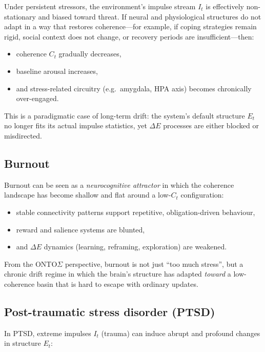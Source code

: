\documentclass[12pt,a4paper]{report}
\begin{document}
Under persistent stressors, the environment's impulse stream \(I_t\) is effectively non-stationary and biased toward threat. If neural and physiological structures do not adapt in a way that restores coherence---for example, if coping strategies remain rigid, social context does not change, or recovery periods are insufficient---then:

\begin{itemize}[leftmargin=2em]
    \item coherence \(C_t\) gradually decreases,
    \item baseline arousal increases,
    \item and stress-related circuitry (e.g.\ amygdala, HPA axis) becomes chronically over-engaged.
\end{itemize}

This is a paradigmatic case of long-term drift: the system's default structure \(E_t\) no longer fits its actual impulse statistics, yet $\Delta E$ processes are either blocked or misdirected.

\subsection*{Burnout}

Burnout can be seen as a \emph{neurocognitive attractor} in which the coherence landscape has become shallow and flat around a low-\(C_t\) configuration:

\begin{itemize}[leftmargin=2em]
    \item stable connectivity patterns support repetitive, obligation-driven behaviour,
    \item reward and salience systems are blunted,
    \item and $\Delta E$ dynamics (learning, reframing, exploration) are weakened.
\end{itemize}

From the ONTO$\Sigma$ perspective, burnout is not just ``too much stress'', but a chronic drift regime in which the brain's structure has adapted \emph{toward} a low-coherence basin that is hard to escape with ordinary updates.

\subsection*{Post-traumatic stress disorder (PTSD)}

In PTSD, extreme impulses \(I_t\) (trauma) can induce abrupt and profound changes in structure \(E_t\):
\end{document}
